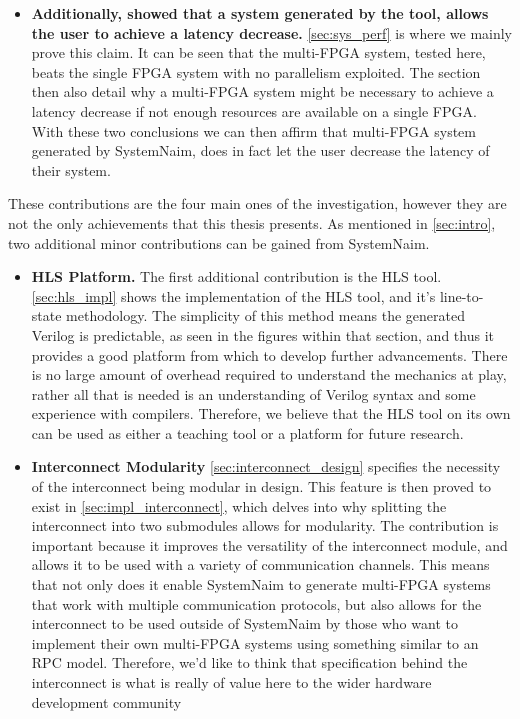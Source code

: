 \begin{itemize}
    \item \textbf{Additionally, showed that a system generated by the tool, allows the user to achieve a latency decrease.} \autoref{sec:sys_perf} is where we mainly prove this claim. It can be seen that the multi-FPGA system, tested here, beats the single FPGA system with no parallelism exploited. The section then also detail why a multi-FPGA system might be necessary to achieve a latency decrease if not enough resources are available on a single FPGA. With these two conclusions we can then affirm that multi-FPGA system generated by SystemNaim, does in fact let the user decrease the latency of their system.
\end{itemize}

These contributions are the four main ones of the investigation, however they are not the only achievements that this thesis presents. As mentioned in \autoref{sec:intro}, two additional minor contributions can be gained from SystemNaim.

\begin{itemize}
    \item \textbf{HLS Platform.} The first additional contribution is the HLS tool. \autoref{sec:hls_impl} shows the implementation of the HLS tool, and it's line-to-state methodology. The simplicity of this method means the generated Verilog is predictable, as seen in the figures within that section, and thus it provides a good platform from which to develop further advancements. There is no large amount of overhead required to understand the mechanics at play, rather all that is needed is an understanding of Verilog syntax and some experience with compilers. Therefore, we believe that the HLS tool on its own can be used as either a teaching tool or a platform for future research.
    \item \textbf{Interconnect Modularity} \autoref{sec:interconnect_design} specifies the necessity of the interconnect being modular in design. This feature is then proved to exist in \autoref{sec:impl_interconnect}, which delves into why splitting the interconnect into two submodules allows for modularity. The contribution is important because it improves the versatility of the interconnect module, and allows it to be used with a variety of communication channels. This means that not only does it enable SystemNaim to generate multi-FPGA systems that work with multiple communication protocols, but also allows for the interconnect to be used outside of SystemNaim by those who want to implement their own multi-FPGA systems using something similar to an RPC model. Therefore, we'd like to think that specification behind the interconnect is what is really of value here to the wider hardware development community
\end{itemize}

